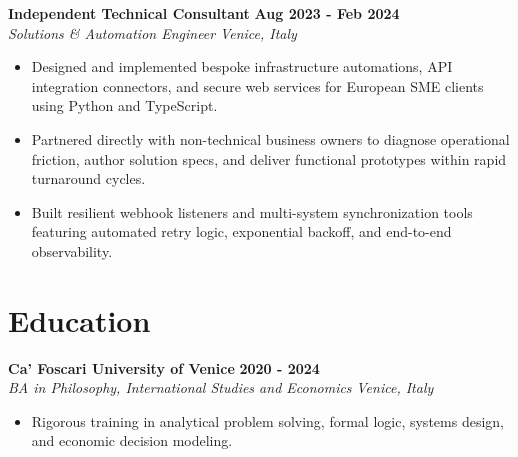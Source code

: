 \documentclass[10pt,a4paper]{article}
\newcommand{\role}[4]{%
  \textbf{#1} \hfill \textbf{#2}\\[1pt]%
  \textit{#3} \hfill \textit{#4}\\[2pt]%
}
\begin{document}
\role{Independent Technical Consultant}{Aug 2023 - Feb 2024}{Solutions \& Automation Engineer}{Venice, Italy}
\begin{itemize}
  \item Designed and implemented bespoke infrastructure automations, API integration connectors, and secure web services for European SME clients using Python and TypeScript.
  \item Partnered directly with non-technical business owners to diagnose operational friction, author solution specs, and deliver functional prototypes within rapid turnaround cycles.
  \item Built resilient webhook listeners and multi-system synchronization tools featuring automated retry logic, exponential backoff, and end-to-end observability.
\end{itemize}

\section{Education}
\role{Ca' Foscari University of Venice}{2020 - 2024}{BA in Philosophy, International Studies and Economics}{Venice, Italy}
\begin{itemize}
  \item Rigorous training in analytical problem solving, formal logic, systems design, and economic decision modeling.
\end{itemize}
\end{document}
